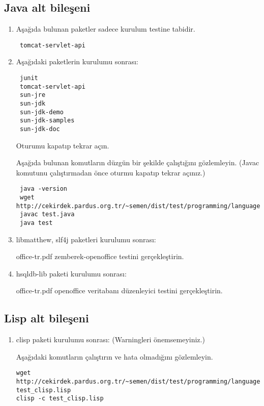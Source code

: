 \documentclass[a4paper,10pt]{article}
\begin{document}
\subsection{Java alt bileşeni}
\begin{enumerate}
\item Aşağıda bulunan paketler sadece kurulum testine tabidir.

\begin{verbatim}
 tomcat-servlet-api
\end{verbatim}

 \item Aşağıdaki paketlerin kurulumu sonrası:
\begin{verbatim}
 junit
 tomcat-servlet-api
 sun-jre
 sun-jdk
 sun-jdk-demo
 sun-jdk-samples
 sun-jdk-doc
\end{verbatim}

Oturumu kapatıp tekrar açın.

Aşağıda bulunan komutların düzgün bir şekilde çalıştığını gözlemleyin. (Javac komutunu çalıştırmadan önce oturmu kapatıp tekrar açınız.)
\begin{verbatim}
 java -version
 wget http://cekirdek.pardus.org.tr/~semen/dist/test/programming/language/java/test.java
 javac test.java
 java test
\end{verbatim}

\item libmatthew, slf4j paketleri kurulumu sonrası:

office-tr.pdf zemberek-openoffice testini gerçekleştirin.

\item hsqldb-lib paketi kurulumu sonrası: 

office-tr.pdf openoffice veritabanı düzenleyici testini gerçekleştirin.

\end{enumerate}



\subsection{Lisp alt bileşeni}
\begin{enumerate}
 \item clisp paketi kurulumu sonrası: (Warningleri önemsemeyiniz.)

Aşağıdaki komutların çalıştırın ve hata olmadığını gözlemleyin.
\begin{verbatim}
wget http://cekirdek.pardus.org.tr/~semen/dist/test/programming/language/lisp/
test_clisp.lisp 
clisp -c test_clisp.lisp
\end{verbatim}

\end{enumerate}
\end{document}
